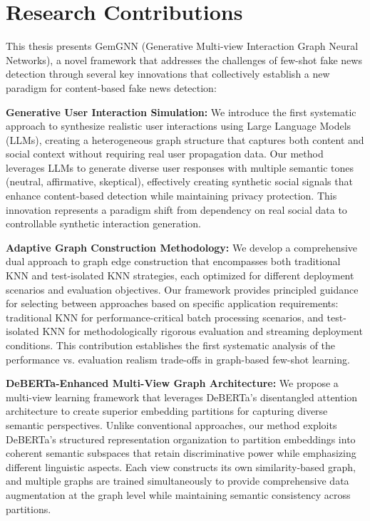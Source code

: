\section{Research Contributions}

This thesis presents GemGNN (Generative Multi-view Interaction Graph Neural Networks), a novel framework that addresses the challenges of few-shot fake news detection through several key innovations that collectively establish a new paradigm for content-based fake news detection:


\textbf{Generative User Interaction Simulation:} We introduce the first systematic approach to synthesize realistic user interactions using Large Language Models (LLMs), creating a heterogeneous graph structure that captures both content and social context without requiring real user propagation data. Our method leverages LLMs to generate diverse user responses with multiple semantic tones (neutral, affirmative, skeptical), effectively creating synthetic social signals that enhance content-based detection while maintaining privacy protection. This innovation represents a paradigm shift from dependency on real social data to controllable synthetic interaction generation.


\textbf{Adaptive Graph Construction Methodology:} We develop a comprehensive dual approach to graph edge construction that encompasses both traditional KNN and test-isolated KNN strategies, each optimized for different deployment scenarios and evaluation objectives. Our framework provides principled guidance for selecting between approaches based on specific application requirements: traditional KNN for performance-critical batch processing scenarios, and test-isolated KNN for methodologically rigorous evaluation and streaming deployment conditions. This contribution establishes the first systematic analysis of the performance vs. evaluation realism trade-offs in graph-based few-shot learning.

\textbf{DeBERTa-Enhanced Multi-View Graph Architecture:} We propose a multi-view learning framework that leverages DeBERTa's disentangled attention architecture to create superior embedding partitions for capturing diverse semantic perspectives. Unlike conventional approaches, our method exploits DeBERTa's structured representation organization to partition embeddings into coherent semantic subspaces that retain discriminative power while emphasizing different linguistic aspects. Each view constructs its own similarity-based graph, and multiple graphs are trained simultaneously to provide comprehensive data augmentation at the graph level while maintaining semantic consistency across partitions.

